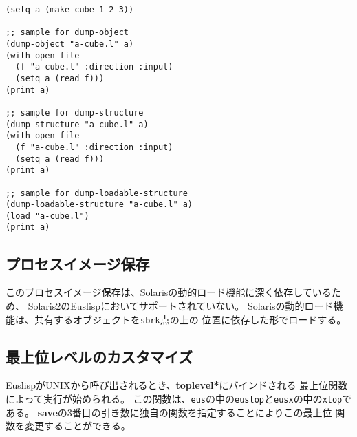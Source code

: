 \begin{verbatim}
(setq a (make-cube 1 2 3))

;; sample for dump-object
(dump-object "a-cube.l" a)
(with-open-file
  (f "a-cube.l" :direction :input)
  (setq a (read f)))
(print a)

;; sample for dump-structure
(dump-structure "a-cube.l" a)
(with-open-file
  (f "a-cube.l" :direction :input)
  (setq a (read f)))
(print a)

;; sample for dump-loadable-structure
(dump-loadable-structure "a-cube.l" a)
(load "a-cube.l")
(print a)
\end{verbatim}

\subsection{プロセスイメージ保存}
このプロセスイメージ保存は、Solarisの動的ロード機能に深く依存しているため、
Solaris2のEuslispにおいてサポートされていない。
Solarisの動的ロード機能は、共有するオブジェクトを{\tt sbrk}点の上の
位置に依存した形でロードする。

\begin{refdesc}

\end{refdesc}

\subsection{最上位レベルのカスタマイズ}
EuslispがUNIXから呼び出されるとき、{\bf *toplevel*}にバインドされる
最上位関数によって実行が始められる。
この関数は、{\tt eus}の中の{\tt eustop}と{\tt eusx}の中の{\tt xtop}である。
{\bf save}の3番目の引き数に独自の関数を指定することによりこの最上位
関数を変更することができる。

